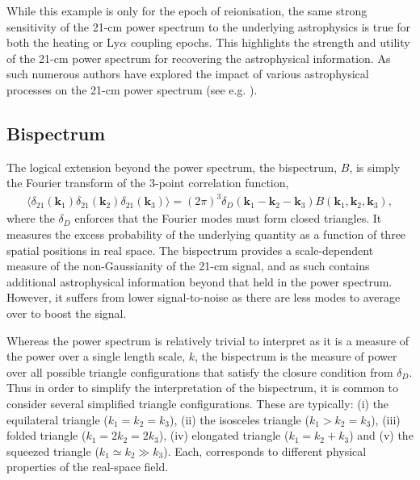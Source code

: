 While this example is only for the epoch of reionisation, the same strong sensitivity of the 21-cm power spectrum to the underlying astrophysics is true for both the heating or Ly$\alpha$ coupling epochs. This highlights the strength and utility of the 21-cm power spectrum for recovering the astrophysical information. As such numerous authors have explored the impact of various astrophysical processes on the 21-cm power spectrum (see e.g. \cite{Bowman:2006,Furlanetto:2006a,Iliev:2006,McQuinn:2006,McQuinn:2007,Pritchard:2007,Lidz:2008,Santos:2008,Baek:2010,Harker:2010,Mesinger:2013,Fialkov:2014b,Pober:2014,Greig:2015,Geil:2016,Greig:2017b,Hassan:2017,Cohen:2018,Greig:2018,Park:2019,Seiler:2019}).

\subsection{Bispectrum} \label{sec:bispectrum}

The logical extension beyond the power spectrum, the bispectrum, $B$, is simply the Fourier transform of the 3-point correlation function,
\begin{eqnarray}
\langle \delta_{21}(\mathbf{k}_{1})\delta_{21}(\mathbf{k}_{2})\delta_{21}(\mathbf{k}_{3}) \rangle = (2\pi)^{3}\delta_{D}( \mathbf{k}_{1} - \mathbf{k}_{2} - \mathbf{k}_{3})B(\mathbf{k}_{1},\mathbf{k}_{2},\mathbf{k}_{3}),
\end{eqnarray}
where the $\delta_{D}$ enforces that the Fourier modes must form closed triangles. It measures the excess probability of the underlying quantity as a function of three spatial positions in real space. The bispectrum provides a scale-dependent measure of the non-Gaussianity of the 21-cm signal, and as such contains additional astrophysical information beyond that held in the power spectrum. However, it suffers from lower signal-to-noise as there are less modes to average over to boost the signal.

Whereas the power spectrum is relatively trivial to interpret as it is a measure of the power over a single length scale, $k$, the bispectrum is the measure of power over all possible triangle configurations that satisfy the closure condition from $\delta_{D}$. Thus in order to simplify the interpretation of the bispectrum, it is common to consider several simplified triangle configurations. These are typically: (i) the equilateral triangle ($k_{1}  = k_{2} = k_{3}$), (ii) the isosceles triangle ($k_{1} > k_{2} = k_{3}$), (iii) folded triangle ($k_{1} = 2k_{2} = 2k_{3}$), (iv) elongated triangle ($k_{1} = k_{2} + k_{3}$) and (v) the squeezed triangle ($k_{1} \simeq k_{2} \gg k_{3}$). Each, corresponds to different physical properties of the real-space field.

